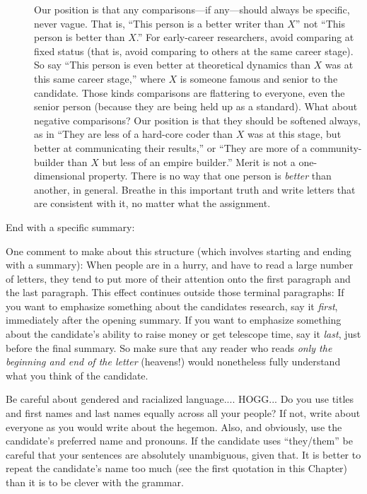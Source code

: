 \documentclass[letterpaper]{book}
\begin{document}
\begin{description}
    Our position is that any comparisons---if any---should always be specific, never vague.
    That is, ``This person is a better writer than $X$'' not ``This person is better than $X$.''
    For early-career researchers, avoid comparing at fixed status (that is, avoid comparing to others at the same career stage).
    So say ``This person is even better at theoretical dynamics than $X$ was at this same career stage,'' where $X$ is someone famous and senior to the candidate.
    Those kinds comparisons are flattering to everyone, even the senior person (because they are being held up as a standard).
    What about negative comparisons?
    Our position is that they should be softened always, as in
    ``They are less of a hard-core coder than $X$ was at this stage, but better at communicating their results,'' or
    ``They are more of a community-builder than $X$ but less of an empire builder.''
    Merit is not a one-dimensional property. There is no way that one person is \emph{better} than another, in general.
    Breathe in this important truth and write letters that are consistent with it, no matter what the assignment.
    \item[End with a specific summary:]
\end{description}
One comment to make about this structure (which involves starting and ending with a summary):
When people are in a hurry, and have to read a large number of letters, they tend to put more of their attention onto the first paragraph and the last paragraph.
This effect continues outside those terminal paragraphs:
If you want to emphasize something about the candidates research, say it \emph{first}, immediately after the opening summary.
If you want to emphasize something about the candidate's ability to raise money or get telescope time, say it \emph{last}, just before the final summary.
So make sure that any reader who reads \emph{only the beginning and end of the letter} (heavens!) would nonetheless fully understand what you think of the candidate.

Be careful about gendered and racialized language.... HOGG... Do you use titles and first names and last names equally across all your people?
If not, write about everyone as you would write about the hegemon.
Also, and obviously, use the candidate's preferred name and pronouns.
If the candidate uses ``they/them'' be careful that your sentences are absolutely unambiguous, given that.
It is better to repeat the candidate's name too much (see the first quotation in this Chapter) than it is to be clever with the grammar.
\end{document}
